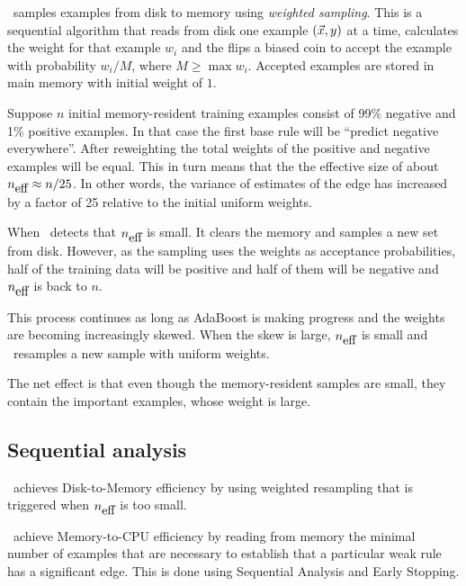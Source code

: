 \Sparrow\ samples examples from disk to memory using {\em weighted
  sampling}. This is a sequential algorithm that reads from disk one
example $(\vec{x},y)$ at a time, calculates the weight for that example
$w_i$ and the flips a biased coin to accept the example with
probability $w_i/M$, where $M\geq \max w_i$. Accepted examples are
stored in main memory with initial weight of $1$.

Suppose $n$ initial memory-resident training examples consist of 99\%
negative and 1\% positive examples. In that case the first base rule
will be ``predict negative everywhere''. After reweighting the total
weights of the positive and negative examples will be equal. This in
turn means that the the effective size of about ${n_{\mbox{eff}}} \approx
n/25$. In other words, the variance of estimates of the edge has
increased by a factor of 25 relative to the initial uniform weights.

When \Sparrow\ detects that ${n_{\mbox{eff}}}$ is small. It clears the memory and
samples a new set from disk. However, as the sampling uses the weights
as acceptance probabilities, half of the training data will be
positive and half of them will be negative and ${n_{\mbox{eff}}}$ is back to $n$.

This process continues as long as AdaBoost is making progress and the
weights are becoming increasingly skewed. When the skew is large,
${n_{\mbox{eff}}}$ is small and \Sparrow\ resamples a new sample with uniform
weights.

The net effect is that even though the memory-resident samples are
small, they contain the important examples, whose weight is large.


\subsection{Sequential analysis}

\Sparrow\ achieves Disk-to-Memory efficiency by using weighted
resampling that is triggered when ${n_{\mbox{eff}}}$ is too small.

\Sparrow\ achieve Memory-to-CPU efficiency by reading from memory the
minimal number of examples that are necessary to establish that a
particular weak rule has a significant edge. This is done using
Sequential Analysis and Early Stopping.

